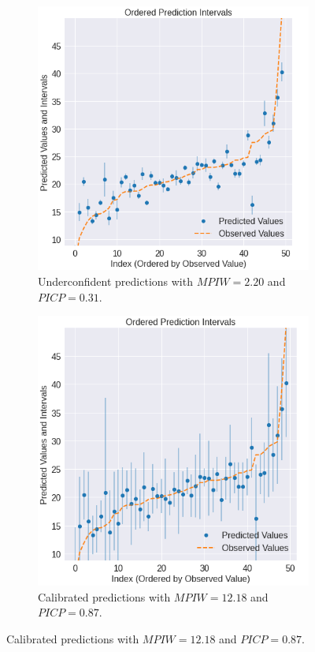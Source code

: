 \begin{figure}
     \centering
     \begin{subfigure}[b]{0.49\textwidth}
         \centering
         \includegraphics[width=\linewidth]{figures/eval/metrics/example_reg_metric_1.png}
         \caption{Underconfident predictions with $MPIW = 2.20$ and $PICP = 0.31$.}
     \end{subfigure}
     \hfill
     \begin{subfigure}[b]{0.49\textwidth}
         \centering
         \includegraphics[width=\textwidth]{figures/eval/metrics/example_reg_metric_2.png}
         \caption{Calibrated predictions with $MPIW = 12.18$ and $PICP = 0.87$.}
     \end{subfigure}


\end{figure}
